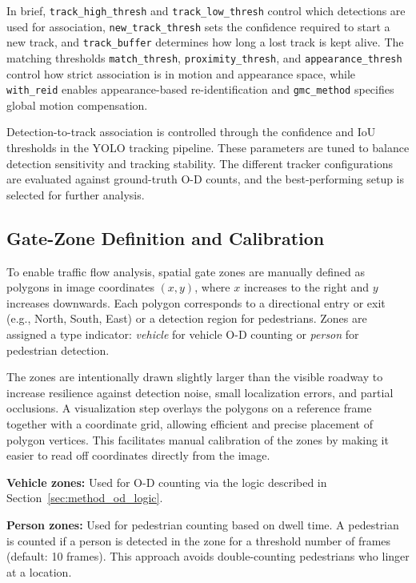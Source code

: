 In brief, \texttt{track\_high\_thresh} and \texttt{track\_low\_thresh} control which detections are used for association, \texttt{new\_track\_thresh} sets the confidence required to start a new track, and \texttt{track\_buffer} determines how long a lost track is kept alive. The matching thresholds \texttt{match\_thresh}, \texttt{proximity\_thresh}, and \texttt{appearance\_thresh} control how strict association is in motion and appearance space, while \texttt{with\_reid} enables appearance-based re-identification and \texttt{gmc\_method} specifies global motion compensation.

Detection-to-track association is controlled through the confidence and IoU thresholds in the YOLO tracking pipeline. These parameters are tuned to balance detection sensitivity and tracking stability. The different tracker configurations are evaluated against ground-truth O-D counts, and the best-performing setup is selected for further analysis.


\subsection{Gate-Zone Definition and Calibration}
\label{sec:method_zones}

To enable traffic flow analysis, spatial gate zones are manually defined as polygons in image coordinates $(x,y)$, where $x$ increases to the right and $y$ increases downwards. Each polygon corresponds to a directional entry or exit (e.g., North, South, East) or a detection region for pedestrians. Zones are assigned a type indicator: \textit{vehicle} for vehicle O-D counting or \textit{person} for pedestrian detection.

The zones are intentionally drawn slightly larger than the visible roadway to increase resilience against detection noise, small localization errors, and partial occlusions. A visualization step overlays the polygons on a reference frame together with a coordinate grid, allowing efficient and precise placement of polygon vertices. This facilitates manual calibration of the zones by making it easier to read off coordinates directly from the image.

\textbf{Vehicle zones:} Used for O-D counting via the logic described in Section~\ref{sec:method_od_logic}.

\textbf{Person zones:} Used for pedestrian counting based on dwell time. A pedestrian is counted if a person is detected in the zone for a threshold number of frames (default: 10 frames). This approach avoids double-counting pedestrians who linger at a location.

